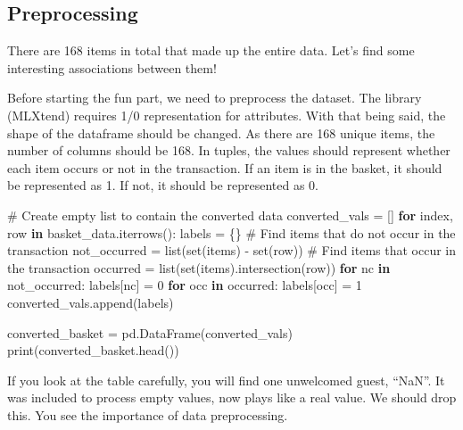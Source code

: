 \documentclass[
  letterpaper,
]{scrbook}
\newenvironment{Shaded}{\begin{snugshade}}{\end{snugshade}}
\newcommand{\BuiltInTok}[1]{\textcolor[rgb]{0.00,0.23,0.31}{#1}}
\newcommand{\CommentTok}[1]{\textcolor[rgb]{0.37,0.37,0.37}{#1}}
\newcommand{\ControlFlowTok}[1]{\textcolor[rgb]{0.00,0.23,0.31}{\textbf{#1}}}
\newcommand{\DecValTok}[1]{\textcolor[rgb]{0.68,0.00,0.00}{#1}}
\newcommand{\KeywordTok}[1]{\textcolor[rgb]{0.00,0.23,0.31}{\textbf{#1}}}
\newcommand{\NormalTok}[1]{\textcolor[rgb]{0.00,0.23,0.31}{#1}}
\newcommand{\OperatorTok}[1]{\textcolor[rgb]{0.37,0.37,0.37}{#1}}
\begin{document}
\subsection*{Preprocessing}\label{preprocessing}

There are 168 items in total that made up the entire data. Let's find
some interesting associations between them!

Before starting the fun part, we need to preprocess the dataset. The
library (MLXtend) requires 1/0 representation for attributes. With that
being said, the shape of the dataframe should be changed. As there are
168 unique items, the number of columns should be 168. In tuples, the
values should represent whether each item occurs or not in the
transaction. If an item is in the basket, it should be represented as 1.
If not, it should be represented as 0.

\begin{Shaded}
\begin{Highlighting}[]
\CommentTok{\# Create empty list to contain the converted data}
\NormalTok{converted\_vals }\OperatorTok{=}\NormalTok{ []}
\ControlFlowTok{for}\NormalTok{ index, row }\KeywordTok{in}\NormalTok{ basket\_data.iterrows():}
\NormalTok{    labels }\OperatorTok{=}\NormalTok{ \{\}}
    \CommentTok{\# Find items that do not occur in the transaction}
\NormalTok{    not\_occurred }\OperatorTok{=} \BuiltInTok{list}\NormalTok{(}\BuiltInTok{set}\NormalTok{(items) }\OperatorTok{{-}} \BuiltInTok{set}\NormalTok{(row))}
    \CommentTok{\# Find items that occur in the transaction}
\NormalTok{    occurred }\OperatorTok{=} \BuiltInTok{list}\NormalTok{(}\BuiltInTok{set}\NormalTok{(items).intersection(row))}
    \ControlFlowTok{for}\NormalTok{ nc }\KeywordTok{in}\NormalTok{ not\_occurred:}
\NormalTok{        labels[nc] }\OperatorTok{=} \DecValTok{0}
    \ControlFlowTok{for}\NormalTok{ occ }\KeywordTok{in}\NormalTok{ occurred:}
\NormalTok{        labels[occ] }\OperatorTok{=} \DecValTok{1}
\NormalTok{    converted\_vals.append(labels)}

\NormalTok{converted\_basket }\OperatorTok{=}\NormalTok{ pd.DataFrame(converted\_vals)}
\BuiltInTok{print}\NormalTok{(converted\_basket.head())}
\end{Highlighting}
\end{Shaded}

If you look at the table carefully, you will find one unwelcomed guest,
``NaN''. It was included to process empty values, now plays like a real
value. We should drop this. You see the importance of data
preprocessing.
\end{document}
